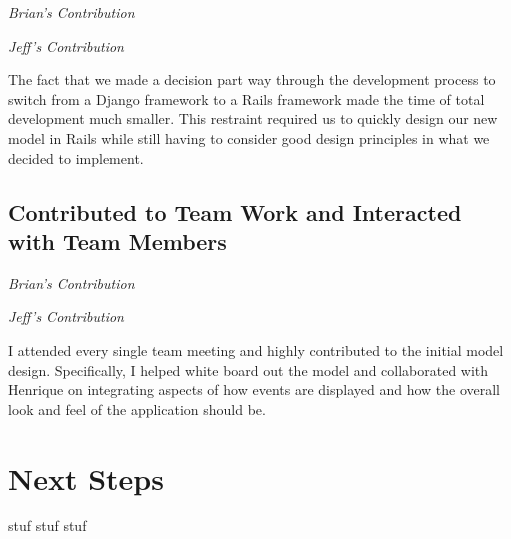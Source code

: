 \documentclass[11pt]{article}
\begin{document}
\textit{Brian's Contribution}



\textit{Jeff's Contribution}

The fact that we made a decision part way through the development process to switch from a Django framework to a Rails framework made the time of total development much smaller.  This restraint required us to quickly design our new model in Rails while still having to consider good design principles in what we decided to implement.

\subsection{Contributed to Team Work and Interacted with Team Members}

\textit{Brian's Contribution}

\textit{Jeff's Contribution}

I attended every single team meeting and highly contributed to the initial model design.  Specifically, I helped white board out the model and collaborated with Henrique on integrating aspects of how events are displayed and how the overall look and feel of the application should be.

\section{Next Steps}

stuf stuf stuf
\end{document}
